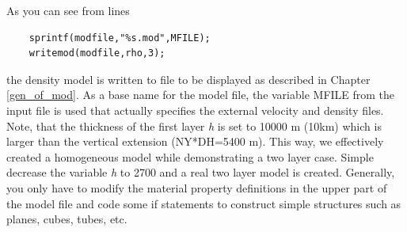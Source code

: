 \documentclass[11pt,onecolumn,oneside]{article}
\begin{document}
As you can see from lines
\begin{verbatim}
    sprintf(modfile,"%s.mod",MFILE);
    writemod(modfile,rho,3);
\end{verbatim}
the density model is written to file to be displayed as described in Chapter \ref{gen_of_mod}. As a base name for the model file, the variable MFILE from the input file is used that actually specifies the external velocity and density files. Note, that the thickness of the first layer \textit{h} is set to 10000 m (10km) which is larger than the vertical extension (NY*DH=5400 m). This way, we effectively created a homogeneous model while demonstrating a two layer case. Simple decrease the variable \textit{h} to 2700 and a real two layer model is created. Generally, you only have to modify the material property definitions in the upper part of the model file and code some if statements to construct simple structures such as planes, cubes, tubes, etc.
\end{document}
